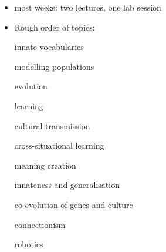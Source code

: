 \documentclass[11pt]{amsart}
\begin{document}
\begin{itemize}
\item most weeks: two lectures, one lab session
\item Rough order of topics: 
\begin{multicols}{2}{\begin{hangparas}{.5cm}{1}\noindent
\par innate vocabularies
\par modelling populations
\par evolution
\par learning
\par cultural transmission
\par cross-situational learning
\par meaning creation
\par innateness and generalisation
\par co-evolution of genes and culture
\par connectionism
\par robotics
\end{hangparas} }\end{multicols}

\end{itemize}
\end{document}
